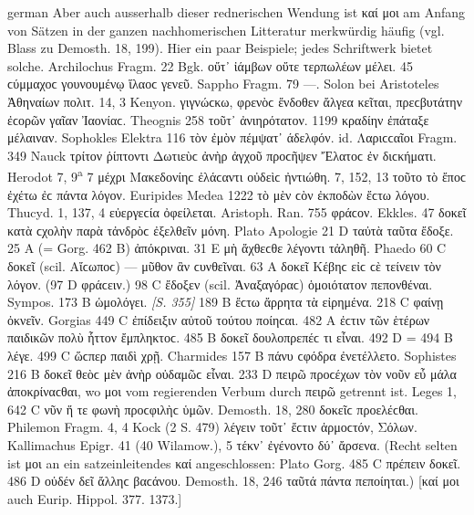\begin{otherlanguage*}{german}
Aber auch ausserhalb dieser rednerischen Wendung ist καί μοι am Anfang von Sätzen in der ganzen nachhomerischen Litteratur merkwürdig häufig (vgl. Blass zu Demosth. 18, 199). Hier ein paar Beispiele; jedes Schriftwerk bietet solche. Archilochus Fragm. 22 Bgk.  οὔτ᾽ ἰάμβων οὔτε τερπωλέων μέλει. 45  ϲύμμαχοϲ γουνουμένῳ ἵλαοϲ γενεῦ. Sappho Fragm. 79  —. Solon bei Aristoteles Ἀθηναίων πολιτ. 14, 3 Kenyon. γιγνώϲκω,  φρενὸϲ ἔνδοθεν ἄλγεα κεῖται, πρεϲβυτάτην ἐϲορῶν γαῖαν Ἰαονίαϲ. Theognis 258  τοῦτ᾽ ἀνιηρότατον. 1199  κραδίην ἐπάταξε μέλαιναν. Sophokles Elektra 116  τὸν ἐμὸν πέμψατ᾽ άδελφόν. id. Λαριϲϲαῖοι Fragm. 349 Nauck  τρίτον ῥίπτοντι Δωτιεὺϲ ἀνὴρ ἀγχοῦ προϲῆψεν Ἔλατοϲ ἐν διϲκήματι. Herodot 7, 9\textsuperscript{a} 7  μέχρι Μακεδονίηϲ ἐλάϲαντι οὐδεὶϲ ἠντιώθη. 7, 152, 13  τοῦτο τὸ ἔποϲ ἐχέτω ἐϲ πάντα λόγον. Euripides Medea 1222  τὸ μὲν ϲὸν ἐκποδὼν ἔϲτω λόγου. Thucyd. 1, 137, 4  εὐεργεϲία ὀφείλεται. Aristoph. Ran. 755  φράϲον. Ekkles. 47  δοκεῖ κατὰ ϲχολὴν παρὰ τἀνδρὸϲ ἐξελθεῖν μόνη. Plato Apologie 21 D  ταὐτὰ ταῦτα ἔδοξε. 25 Α (= Gorg. 462 Β)  ἀπόκριναι. 31 E  μὴ ἄχθεϲθε λέγοντι τἀληθῆ. Phaedo 60 C  δοκεῖ (scil. Αἴϲωποϲ) — μῦθον ἂν ϲυνθεῖναι. 63 Α  δοκεῖ Κέβηϲ εἰϲ ϲὲ τείνειν τὸν λόγον. (97 D  φράϲειν.) 98 C  ἔδοξεν (scil. Ἀναξαγόραϲ) ὁμοιότατον πεπονθέναι. Sympos. 173 Β  ὡμολόγει. \hypertarget{p355}{\emph{[S. 355]}}\label{p355} 189 B  ἔϲτω ἄρρητα τὰ εἰρημένα. 218 C  φαίνῃ ὀκνεῖν. Gorgias 449 C  ἐπίδειξιν αὐτοῦ τούτου ποίηϲαι. 482 Α  ἐϲτιν τῶν ἑτέρων παιδικῶν πολὺ ἧττον ἔμπληκτοϲ. 485 Β  δοκεῖ δουλοπρεπέϲ τι εἶναι. 492 D = 494 Β  λέγε. 499 C  ὥϲπερ παιδὶ χρῇ. Charmides 157 Β  πάνυ ϲφόδρα ἐνετέλλετο. Sophistes 216 Β  δοκεῖ θεὸϲ μὲν ἁνὴρ οὐδαμῶϲ εἶναι. 233 D  πειρῶ προϲέχων τὸν νοῦν εὖ μάλα ἀποκρίναϲθαι, wo μοι vom regierenden Verbum durch πειρῶ getrennt ist. Leges 1, 642 C  νῦν ἥ τε φωνὴ προϲφιλὴϲ ὑμῶν. Demosth. 18, 280  δοκεῖϲ προελέϲθαι. Philemon Fragm. 4, 4 Kock (2 S. 479)  λέγειν τοῦτ᾽ ἔϲτιν ἁρμοϲτόν, Σόλων. Kallimachus Epigr. 41 (40 Wilamow.), 5  τέκν᾽ ἐγένοντο δύ᾽ ἄρσενα. (Recht selten ist μοι an ein satzeinleitendes καί  angeschlossen: Plato Gorg. 485 C  πρέπειν  δοκεῖ. 486 D  οὐδέν  δεῖ ἄλληϲ βαϲάνου. Demosth. 18, 246  ταῦτά  πάντα πεποίηται.) [καί μοι auch Eurip. Hippol. 377. 1373.]


\end{otherlanguage*}
